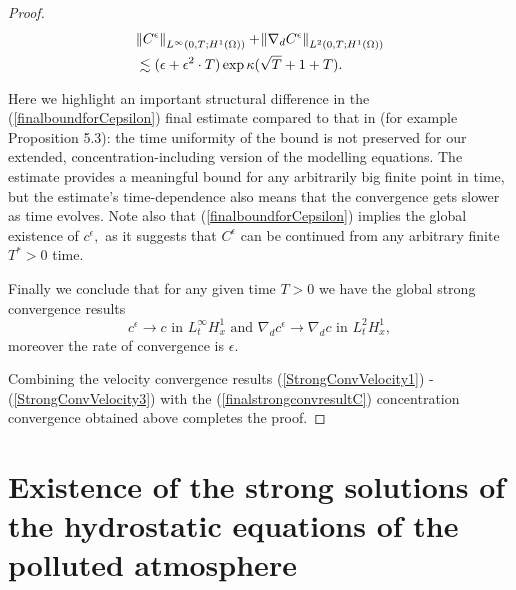 \documentclass[11pt]{article}
\begin{document}
\begin{proof}
\begin{equation} \label{finalboundforCepsilon}
\begin{split}
& \norm{C^\epsilon}_{L^\infty(0,T; H^1(\Omega))} + \norm{\nabla_d C^\epsilon}_{L^2(0,T; H^1(\Omega))} \\
& \lesssim (\epsilon + \epsilon^2 \cdot T) \exp{\kappa (\sqrt{T} + 1 + T)}.
\end{split}
\end{equation}

Here we highlight an important structural difference in the (\ref{finalboundforCepsilon}) final estimate compared to that in \cite{li2019primitive} (for example Proposition 5.3): the time uniformity of the bound is not preserved for our extended, concentration-including version of the modelling equations. The estimate provides a meaningful bound for any arbitrarily big finite point in time, but the estimate's time-dependence also means that the convergence gets slower as time evolves. Note also that (\ref{finalboundforCepsilon}) implies the global existence of $c^\epsilon,$ as it suggests that $C^\epsilon$ can be continued from any arbitrary finite $T^* > 0$ time.

Finally we conclude that for any given time $T > 0$ we have the global strong convergence results
%
\begin{equation} \label{finalstrongconvresultC}
c^\epsilon \to c \text{ in } L_t^\infty H_x^1 \text{ and } \nabla_d c^\epsilon \to \nabla_d c \text{ in } L_t^2 H_x^1,
\end{equation}
%
moreover the rate of convergence is $\epsilon.$

Combining the velocity convergence results (\ref{StrongConvVelocity1}) - (\ref{StrongConvVelocity3}) with the (\ref{finalstrongconvresultC}) concentration convergence obtained above completes the proof.

\end{proof}

\appendix

\section{Existence of the strong solutions of the hydrostatic equations of the polluted atmosphere}
\end{document}
